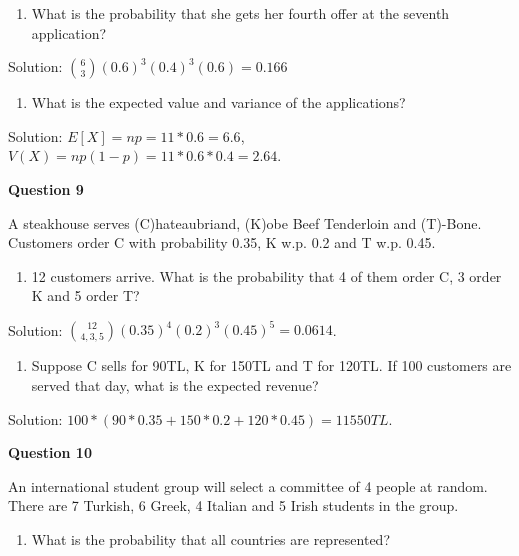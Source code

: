 \documentclass[]{book}
\providecommand{\tightlist}{%
  \setlength{\itemsep}{0pt}\setlength{\parskip}{0pt}}
\theoremstyle{definition}
\theoremstyle{definition}
\theoremstyle{definition}
\theoremstyle{remark}
\begin{document}
\begin{enumerate}
\def\labelenumi{\alph{enumi})}
\setcounter{enumi}{1}
\tightlist
\item
  What is the probability that she gets her fourth offer at the seventh
  application?
\end{enumerate}

Solution: \(\binom{6}{3} (0.6)^3(0.4)^{3}(0.6) = 0.166\)

\begin{enumerate}
\def\labelenumi{\alph{enumi})}
\setcounter{enumi}{2}
\tightlist
\item
  What is the expected value and variance of the applications?
\end{enumerate}

Solution: \(E[X] = np = 11*0.6 = 6.6\),
\(V(X) = np(1-p) = 11*0.6*0.4 = 2.64\).

\textbf{Question 9}

A steakhouse serves (C)hateaubriand, (K)obe Beef Tenderloin and
(T)-Bone. Customers order C with probability 0.35, K w.p. 0.2 and T w.p.
0.45.

\begin{enumerate}
\def\labelenumi{\alph{enumi})}
\tightlist
\item
  12 customers arrive. What is the probability that 4 of them order C, 3
  order K and 5 order T?
\end{enumerate}

Solution: \(\binom{12}{4,3,5}(0.35)^4(0.2)^3(0.45)^5 = 0.0614\).

\begin{enumerate}
\def\labelenumi{\alph{enumi})}
\setcounter{enumi}{1}
\tightlist
\item
  Suppose C sells for 90TL, K for 150TL and T for 120TL. If 100
  customers are served that day, what is the expected revenue?
\end{enumerate}

Solution: \(100*(90*0.35 + 150*0.2 + 120*0.45) = 11550TL\).

\textbf{Question 10}

An international student group will select a committee of 4 people at
random. There are 7 Turkish, 6 Greek, 4 Italian and 5 Irish students in
the group.

\begin{enumerate}
\def\labelenumi{\alph{enumi})}
\tightlist
\item
  What is the probability that all countries are represented?
\end{enumerate}
\end{document}
